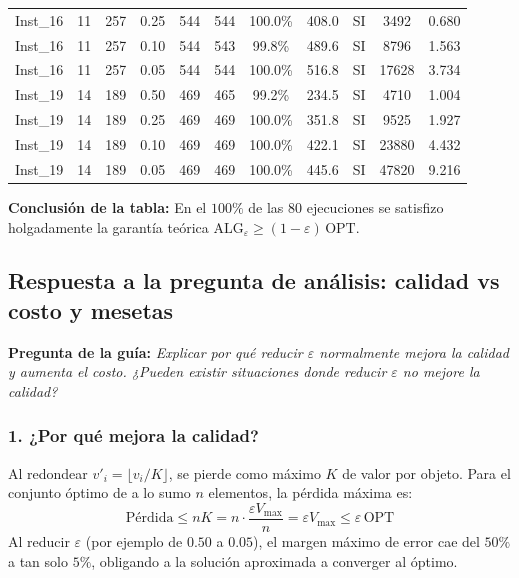 \begin{table}[H]
\begin{tabular*}{\textwidth}{@{\extracolsep{\fill}}lcccccccccc}
Inst\_16 & 11 & 257 & 0.25 & 544 & 544 & 100.0\% & 408.0 & SI & 3492 & 0.680 \\
Inst\_16 & 11 & 257 & 0.10 & 544 & 543 & 99.8\% & 489.6 & SI & 8796 & 1.563 \\
Inst\_16 & 11 & 257 & 0.05 & 544 & 544 & 100.0\% & 516.8 & SI & 17628 & 3.734 \\
Inst\_19 & 14 & 189 & 0.50 & 469 & 465 & 99.2\% & 234.5 & SI & 4710 & 1.004 \\
Inst\_19 & 14 & 189 & 0.25 & 469 & 469 & 100.0\% & 351.8 & SI & 9525 & 1.927 \\
Inst\_19 & 14 & 189 & 0.10 & 469 & 469 & 100.0\% & 422.1 & SI & 23880 & 4.432 \\
Inst\_19 & 14 & 189 & 0.05 & 469 & 469 & 100.0\% & 445.6 & SI & 47820 & 9.216 \\
        \bottomrule
    \end{tabular*}
\end{table}

\noindent\textbf{Conclusión de la tabla:} En el $100\%$ de las 80 ejecuciones se satisfizo holgadamente la garantía teórica $\text{ALG}_\varepsilon \ge (1 - \varepsilon)\,\text{OPT}$.

\subsection{Respuesta a la pregunta de análisis: calidad vs costo y mesetas}
\textbf{Pregunta de la guía:} \textit{Explicar por qué reducir $\varepsilon$ normalmente mejora la calidad y aumenta el costo. ¿Pueden existir situaciones donde reducir $\varepsilon$ no mejore la calidad?}

\subsubsection*{1. ¿Por qué mejora la calidad?}
Al redondear $v'_i = \lfloor v_i / K \rfloor$, se pierde como máximo $K$ de valor por objeto. Para el conjunto óptimo de a lo sumo $n$ elementos, la pérdida máxima es:
\begin{equation}
    \text{Pérdida} \le n K = n \cdot \frac{\varepsilon V_{\max}}{n} = \varepsilon V_{\max} \le \varepsilon\,\text{OPT}
\end{equation}
Al reducir $\varepsilon$ (por ejemplo de $0.50$ a $0.05$), el margen máximo de error cae del $50\%$ a tan solo $5\%$, obligando a la solución aproximada a converger al óptimo.

